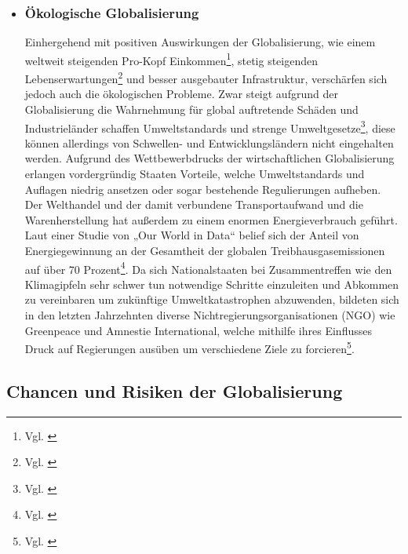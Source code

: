 \documentclass[12pt]{article}
\begin{document}
\begin{itemize}
\begin{sloppypar}
    \end{sloppypar}
    \item \subsubsection{Ökologische Globalisierung}
    Einhergehend mit positiven Auswirkungen der Globalisierung, wie einem weltweit steigenden Pro-Kopf Einkommen\footnote{Vgl. \cite{Lammar2013}}, stetig steigenden Lebenserwartungen\footnote{Vgl. \cite{Radtke2021}} und besser ausgebauter Infrastruktur, verschärfen sich jedoch auch die ökologischen Probleme. Zwar steigt aufgrund der Globalisierung die Wahrnehmung für global auftretende Schäden und Industrieländer schaffen Umweltstandards und strenge Umweltgesetze\footnote{Vgl. \cite{WikipGlobWirtsch}}, diese können allerdings von Schwellen- und Entwicklungsländern nicht eingehalten werden. Aufgrund des Wettbewerbdrucks der wirtschaftlichen Globalisierung erlangen vordergründig Staaten Vorteile, welche Umweltstandards und Auflagen niedrig ansetzen oder sogar bestehende Regulierungen aufheben. Der Welthandel und der damit verbundene Transportaufwand und die Warenherstellung hat außerdem zu einem enormen Energieverbrauch geführt. Laut einer Studie von „Our World in Data“ belief sich der Anteil von Energiegewinnung an der Gesamtheit der globalen Treibhausgasemissionen auf über 70 Prozent\footnote{Vgl. \cite{Ritchie2021}}. Da sich Nationalstaaten bei Zusammentreffen wie den Klimagipfeln sehr schwer tun notwendige Schritte einzuleiten und Abkommen zu vereinbaren um zukünftige Umweltkatastrophen abzuwenden, bildeten sich in den letzten Jahrzehnten diverse Nichtregierungsorganisationen (NGO) wie Greenpeace und Amnestie International, welche mithilfe ihres Einflusses Druck auf Regierungen ausüben um verschiedene Ziele zu forcieren\footnote{Vgl. \cite{Ehrlich1966} }.
\end{itemize}
\subsection{Chancen und Risiken der Globalisierung}
\end{document}
